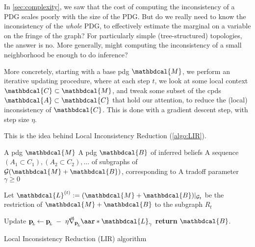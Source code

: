 \documentclass{article}
\theoremstyle{plain}
\theoremstyle{definition}
\theoremstyle{remark}
\newcommand\mat[1]{\mathbf{#1}}
\newcommand{\grad}{\vec\nabla}
\newcommand{\bp}[1][L]{\mat{p}_{\!_{#1}\!}}
\newcommand{\Ed}{\mathcal E}
\newcommand{\dg}[1]{\mathbdcal{#1}}
\newcommand{\bundle}{\mathbin{+}}
\newcommand{\Gr}{\mathcal G}
\begin{document}
In \cref{sec:complexity}, we saw that the cost of computing the inconsistency of a PDG scales poorly with the size of the PDG.
But do we really need to know the inconsistency of the \emph{whole} PDG, to effectively estimate the marginal on a variable on the fringe of the graph? For particularly simple (tree-structured) topologies, the answer is no. More generally, might computing the inconsistency of a small neighborhood be enough to do inference?

More concretely, starting with a base pdg $\dg M$, we perform an iterative updating procedure, where at each step $t$, we look at some local context $\dg C \subset \dg M$, and tweak some subset of the cpds $\dg A \subset \dg C$ that hold our attention, to reduce the (local) inconsistency of $\dg C$. This is done with a gradient descent step, with step size $\eta$.


 This is the idea behind Local Inconsistency Reduction (\cref{algo:LIR}).

\begin{algorithm}
	\begin{algorithmic}
		\Require A pdg $\dg M$
		\Require A pdg $\dg B$ of inferred beliefs
		\Require A sequence $(A_1 \subset C_1), (A_2 \subset C_2), \ldots $ of subgraphs of $\Gr({\dg M \bundle \dg B})$, corresponding to
		\Require A tradoff parameter $\gamma \ge 0$

		\Statex

		\Procedure{LIR}{$\dg M, \dg B, \mathcal R, \gamma$}
			\State Let $\dg L^{(t)} := (\dg M \bundle \dg B) |_{\Gr_t}$ be the restriction of $\dg M \bundle \dg B$ to the subgraph $R_t$
			\ForAll{edges $L \in \Ed^{\dg B |_{R_t}}$}

			 	\State Update $\bp[L] \gets \bp[L] ~ - ~\eta\grad_{\bp[L]} \aar*{\dg L}_\gamma$
			\EndFor
		\EndFor
		\State \textbf{return} $\dg B$.
		\EndProcedure
	\end{algorithmic}
	\caption{Local Inconsistency Reduction (LIR) algorithm}
	\label{algo:LIR}
\end{algorithm}
\end{document}
